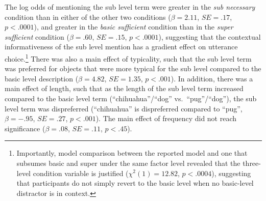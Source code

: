\documentclass[11pt]{article}
\newcommand{\jd}[1]{\textcolor{Red}{[jd: #1]}}
\begin{document}
%

The log odds of mentioning the sub level term were greater in the \emph{sub necessary} condition than in either of the other two conditions ($\beta = 2.11$, $SE = .17$, $p < .0001$), and greater in the \emph{basic sufficient} condition than in the \emph{super sufficient} condition ($\beta = .60$, $SE = .15$, $p < .0001$), suggesting that the contextual informativeness of the sub level mention has a gradient effect on utterance choice.\footnote{Importantly, model comparison between the reported model and one that subsumes basic and super under the same factor level revealed that the three-level condition variable is justified ($\chi ^2 (1) = 12.82$, $p < .0004$), suggesting that participants do not simply revert to the basic level when no basic-level distractor is in context.} There was also a main effect of typicality, such that the sub level term was preferred for objects that were more typical for the sub level compared to the basic level  description ($\beta = 4.82$, $SE = 1.35$, $p < .001$). In addition, there was a main effect of length, such that as the length of the sub level term increased compared to the basic level term (``chihuahua''/``dog'' vs.~``pug''/``dog''), the sub level term was dispreferred (``chihuahua'' is dispreferred compared to ``pug'', $\beta = -.95$, $SE = .27$, $p < .001$). The main effect of frequency did not reach significance ($\beta = .08$, $SE = .11$, $p < .45$).


%
\end{document}
